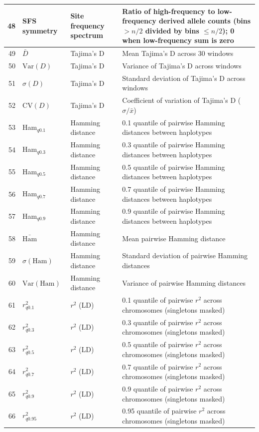\begin{longtable}{@{}rllp{7.5cm}@{}}
48 & SFS symmetry & Site frequency spectrum & Ratio of high-frequency to low-frequency derived allele counts (bins $> n/2$ divided by bins $\leq n/2$); 0 when low-frequency sum is zero \\
\midrule
49 & $\bar{D}$ & Tajima's D & Mean Tajima's D across 30 windows \\
50 & $\mathrm{Var}(D)$ & Tajima's D & Variance of Tajima's D across windows \\
51 & $\sigma(D)$ & Tajima's D & Standard deviation of Tajima's D across windows \\
52 & $\mathrm{CV}(D)$ & Tajima's D & Coefficient of variation of Tajima's D ($\sigma/\bar{x}$) \\
\midrule
53 & Ham$_{q0.1}$ & Hamming distance & 0.1 quantile of pairwise Hamming distances between haplotypes \\
54 & Ham$_{q0.3}$ & Hamming distance & 0.3 quantile of pairwise Hamming distances between haplotypes \\
55 & Ham$_{q0.5}$ & Hamming distance & 0.5 quantile of pairwise Hamming distances between haplotypes \\
56 & Ham$_{q0.7}$ & Hamming distance & 0.7 quantile of pairwise Hamming distances between haplotypes \\
57 & Ham$_{q0.9}$ & Hamming distance & 0.9 quantile of pairwise Hamming distances between haplotypes \\
58 & $\bar{\mathrm{Ham}}$ & Hamming distance & Mean pairwise Hamming distance \\
59 & $\sigma(\mathrm{Ham})$ & Hamming distance & Standard deviation of pairwise Hamming distances \\
60 & $\mathrm{Var}(\mathrm{Ham})$ & Hamming distance & Variance of pairwise Hamming distances \\
\midrule
61 & $r^2_{q0.1}$ & $r^2$ (LD) & 0.1 quantile of pairwise $r^2$ across chromosomes (singletons masked) \\
62 & $r^2_{q0.3}$ & $r^2$ (LD) & 0.3 quantile of pairwise $r^2$ across chromosomes (singletons masked) \\
63 & $r^2_{q0.5}$ & $r^2$ (LD) & 0.5 quantile of pairwise $r^2$ across chromosomes (singletons masked) \\
64 & $r^2_{q0.7}$ & $r^2$ (LD) & 0.7 quantile of pairwise $r^2$ across chromosomes (singletons masked) \\
65 & $r^2_{q0.9}$ & $r^2$ (LD) & 0.9 quantile of pairwise $r^2$ across chromosomes (singletons masked) \\
66 & $r^2_{q0.95}$ & $r^2$ (LD) & 0.95 quantile of pairwise $r^2$ across chromosomes (singletons masked) \\

\end{longtable}
